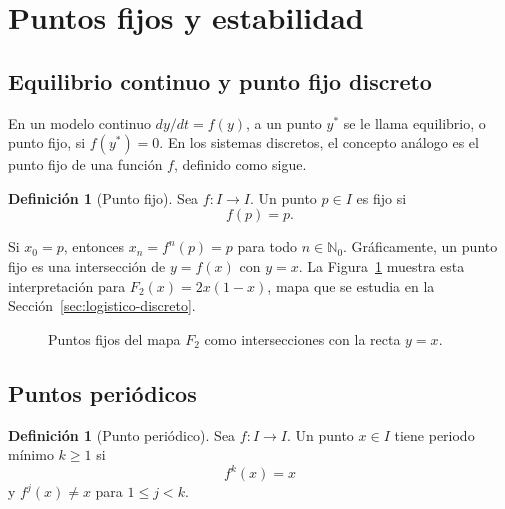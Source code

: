 \documentclass[11pt,letterpaper]{article}
\theoremstyle{definition}
\newtheorem{definicion}[teorema]{Definición}
\theoremstyle{remark}
\begin{document}
\section{Puntos fijos y estabilidad}
\label{sec:puntos-fijos-estabilidad}

\subsection{Equilibrio continuo y punto fijo discreto}

En un modelo continuo \(dy/dt=f(y)\), a un punto \(y^*\) se le llama equilibrio,
o punto fijo, si \(f(y^*)=0\). En los sistemas discretos, el concepto análogo es
el punto fijo de una función \(f\), definido como sigue.

\begin{definicion}[Punto fijo]
Sea \(f\colon I\to I\). Un punto \(p\in I\) es fijo si
\[
f(p)=p.
\]
\end{definicion}

Si \(x_0=p\), entonces \(x_n=f^n(p)=p\) para todo \(n\in\mathbb N_0\). Gráficamente, un punto fijo es una intersección de \(y=f(x)\) con \(y=x\). La Figura~\ref{fig:punto-fijo-interseccion} muestra esta interpretación para \(F_2(x)=2x(1-x)\), mapa que se estudia en la Sección~\ref{sec:logistico-discreto}.

\begin{figure}[htbp]
    \centering
    \caption{Puntos fijos del mapa \(F_2\) como intersecciones con la recta \(y=x\).}
    \label{fig:punto-fijo-interseccion}
\end{figure}

\subsection{Puntos periódicos}

\begin{definicion}[Punto periódico]
\label{def:punto-periodico}
Sea \(f\colon I\to I\). Un punto \(x\in I\) tiene periodo mínimo \(k\geq1\) si
\[
f^k(x)=x
\]
y \(f^j(x)\neq x\) para \(1\leq j<k\).
\end{definicion}
\end{document}
